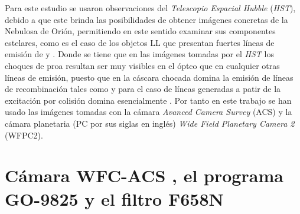 % 



% 


\label{chap:datos}

Para este estudio se usaron observaciones del \textit{Telescopio Espacial Hubble} (\textit{HST}), debido a que este brinda las posibilidades de obtener imágenes concretas de la Nebulosa de Orión, permitiendo en este sentido examinar sus componentes estelares, como es el caso de los objetos LL que presentan fuertes líneas de emisión de \ha{} y \oiii{}. Donde se tiene que en las imágenes tomadas por el \textit{HST} los choques de proa resultan ser muy visibles en el óptco que en cualquier otras líneas de emisión, puesto que en la cáscara chocada domina la emisión de líneas de recombinación tales como \ha{} y para el caso de líneas generadas a patir de la excitación por colisión domina esencialmente \oiii{}. Por tanto en este trabajo se han usado las imágenes tomadas con la cámara \textit{Avanced Camera Survey} (ACS) y la cámara planetaria (PC por sus siglas en inglés) \textit{Wide Field Planetary Camera 2} (WFPC2). 

\section{Cámara  WFC-ACS , el programa GO-9825 y el filtro F658N }
\label{sec:acs}

